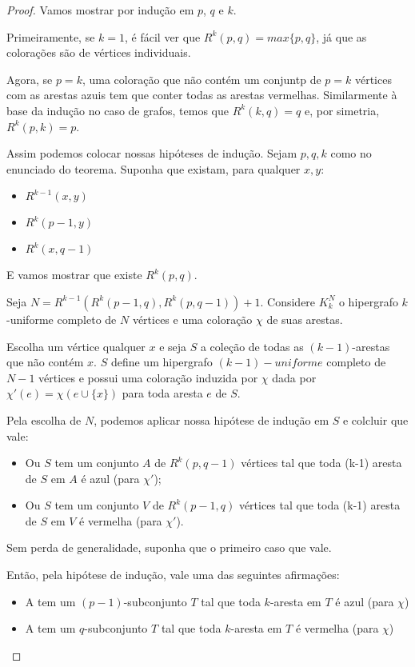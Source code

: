 \documentclass[a4paper]{book}
\begin{document}
\begin{proof}
    Vamos mostrar por indução em $p$, $q$ e $k$.

    Primeiramente, se $k=1$, é fácil ver que $R^k(p,q)=max\{p,q\}$, já que as colorações são de vértices individuais.

    Agora, se $p=k$, uma coloração que não contém um conjuntp de $p=k$ vértices com as arestas azuis tem que conter todas as arestas vermelhas. Similarmente à base da indução no caso de grafos, temos que $R^k(k,q)=q$ e, por simetria, $R^k(p,k)=p$.

    Assim podemos colocar nossas hipóteses de indução. Sejam $p,q,k$ como no enunciado do teorema. Suponha que existam, para qualquer $x,y$:
    \begin{itemize}
        \item $R^{k-1}(x,y)$
        \item $R^k(p-1,y)$
        \item $R^k(x,q-1)$
    \end{itemize}
    E vamos mostrar que existe $R^k(p,q)$.

    Seja $N=R^{k-1}(R^k(p-1,q),R^k(p,q-1))+1$. Considere $K^N_k$ o hipergrafo $k$-uniforme completo de $N$ vértices e uma coloração $\chi$ de suas arestas.

    Escolha um vértice qualquer $x$ e seja $S$ a coleção de todas as $(k-1)$-arestas que não contém $x$. $S$ define um hipergrafo $(k-1)-uniforme$ completo de $N-1$ vértices e possui uma coloração induzida por $\chi$ dada por $\chi'(e)=\chi(e\cup\{x\})$ para toda aresta $e$ de $S$. 
    
    Pela escolha de $N$, podemos aplicar nossa hipótese de indução em $S$ e colcluir que vale:
    \begin{itemize}
        \item Ou $S$ tem um conjunto $A$ de $R^k(p,q-1)$ vértices tal que toda (k-1) aresta de $S$ em $A$ é azul (para $\chi'$);
        \item Ou $S$ tem um conjunto $V$ de $R^k(p-1,q)$ vértices tal que toda (k-1) aresta de $S$ em $V$ é vermelha (para $\chi'$).
    \end{itemize}
    Sem perda de generalidade, suponha que o primeiro caso que vale.

    Então, pela hipótese de indução, vale uma das seguintes afirmações:
    \begin{itemize}
        \item A tem um $(p-1)$-subconjunto $T$ tal que toda $k$-aresta em $T$ é azul (para $\chi$)
        \item A tem um $q$-subconjunto $T$ tal que toda $k$-aresta em $T$ é vermelha (para $\chi$)
    \end{itemize}
\end{proof}
\end{document}
